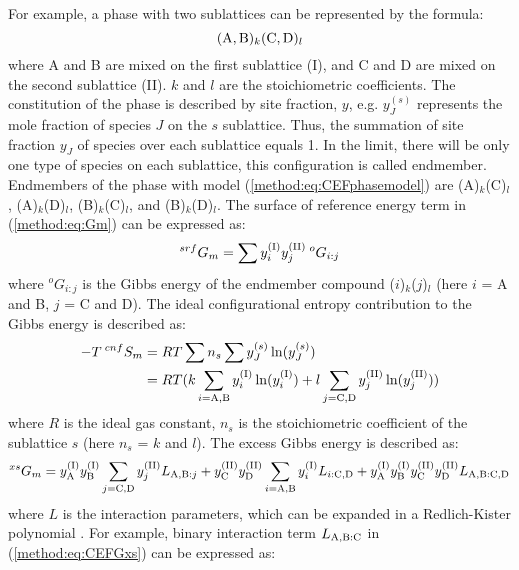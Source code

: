 For example, a phase with two sublattices can be represented by the formula:
\begin{equation} \label{method:eq:CEFphasemodel}
    ({\rm A,B})_k({\rm C,D})_l
\end{equation}
where A and B are mixed on the first sublattice (I), and C and D are mixed on the second sublattice (II). $k$ and $l$ are the stoichiometric coefficients. The constitution of the phase is described by site fraction, $y$, e.g. $y_{J}^{(s)}$ represents the mole fraction of species $J$ on the $s$ sublattice. Thus, the summation of site fraction $y_{J}$ of species over each sublattice equals 1. In the limit, there will be only one type of species on each sublattice, this configuration is called endmember. Endmembers of the phase with model (\ref{method:eq:CEFphasemodel}) are (A)${_k}$(C)${_l}$, (A)${_k}$(D)${_l}$, (B)${_k}$(C)${_l}$, and (B)${_k}$(D)${_l}$. The surface of reference energy term in (\ref{method:eq:Gm}) can be expressed as:
\begin{equation} \label{method:eq:CEFGsrf}
    ^{srf}G_m=\sum y_i^{({\rm I})}y_j^{({\rm II})}\:^{o}G_{i:j}
\end{equation}
where $^{o}G_{i:j}$ is the Gibbs energy of the endmember compound ($i$)${_k}$($j$)${_l}$ (here $i$ = A and B, $j$ = C and D). The ideal configurational entropy contribution to the Gibbs energy is described as:
\begin{equation} \label{method:eq:CEFScnf}
    \begin{aligned}
        -T\:^{cnf}S_m&=RT\sum n_s \sum y_J^{(s)} \ln (y_J^{(s)})\\
        &=RT(k\sum_{i={\rm A,B}} y_i^{({\rm I})}\ln (y_i^{({\rm I})})+l\sum_{j={\rm C,D}} y_j^{({\rm II})}\ln (y_j^{({\rm II})}))
    \end{aligned}
\end{equation}
where $R$ is the ideal gas constant, $n_s$ is the stoichiometric coefficient of the sublattice $s$ (here $n_s$ = $k$ and $l$). The excess Gibbs energy is described as:
\begin{equation} \label{method:eq:CEFGxs}
    ^{xs}G_m=y_{\rm A}^{({\rm I})}y_{\rm B}^{({\rm I})}\sum_{j={\rm C,D}} y_j^{({\rm II})} L_{{\rm A,B}:j}+y_{\rm C}^{({\rm II})}y_{\rm D}^{({\rm II})}\sum_{i={\rm A,B}} y_i^{({\rm I})} L_{i:{\rm C,D}}+y_{\rm A}^{({\rm I})}y_{\rm B}^{({\rm I})}y_{\rm C}^{({\rm II})}y_{\rm D}^{({\rm II})}L_{{\rm A,B}:{\rm C,D}}
\end{equation}
where $L$ is the interaction parameters, which can be expanded in a Redlich-Kister polynomial \cite{redlich1948algebraic}. For example, binary interaction term $L_{{\rm A,B}: {\rm C}}$ in (\ref{method:eq:CEFGxs}) can be expressed as:
